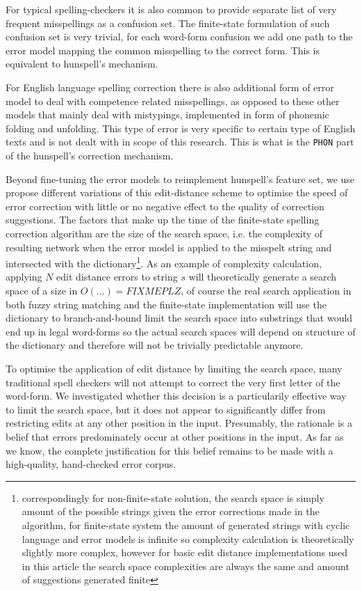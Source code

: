 \documentclass[11pt]{article}
\begin{document}
For typical spelling-checkers it is also common to provide separate list of
very frequent misspellings as a confusion set. The finite-state formulation
of such confusion set is very trivial, for each word-form confusion we add
one path to the error model mapping the common misspelling to the correct
form. This is equivalent to hunspell's \texttt{} mechanism.

For English language spelling correction there is also additional form of
error model to deal with competence related misspellings, as opposed to these
other models that mainly deal with mistypings, implemented in form of phonemic
folding and unfolding. This type of error is very specific to certain type of
English texts and is not dealt with in scope of this research. This is what is
the \texttt{PHON} part of the hunspell's correction mechanism.

Beyond fine-tuning the error models to reimplement hunspell's feature set, we
use propose different variations of this edit-distance scheme to optimise the
speed of error correction with little or no negative effect to the quality of
correction suggestions. The factors that make up the time of the finite-state
spelling correction algorithm are the size of the search space, i.e. the
complexity of resulting network when the error model is applied to the misspelt
string and intersected with the dictionary\footnote{correspondingly for
non-finite-state solution, the search space is simply amount of the possible
strings given the error corrections made in the algorithm, for finite-state
system the amount of generated strings with cyclic language and error models is
infinite so complexity calculation is theoretically slightly more complex,
however for basic edit distance implementations used in this article the search
space complexities are always the same and amount of suggestions generated
finite}. As an example of complexity calculation, applying $N$ edit distance
errors to string $s$ will theoretically generate a search space of a size in
$O(...) = FIXME PLZ$, \cite{mitankin/2005} of course the real search
application in both fuzzy string matching and the finite-state implementation
will use the dictionary to branch-and-bound limit the search space into
substrings that would end up in legal word-forms so the actual search spaces
will depend on structure of the dictionary and therefore will not be trivially
predictable anymore.

To optimise the application of edit distance by limiting the search space,
many traditional spell checkers
will not attempt to correct the very first letter of the word-form. We
investigated whether this decision is a particularily effective way to
limit the search space, but it does not appear to significantly differ from
restricting edits at any other position in the input. Presumably, the
rationale is a belief that errors predominately occur at other positions
in the input. As far as we know, the complete justification for this belief
remains to be made with a high-quality, hand-checked error corpus.
\end{document}
